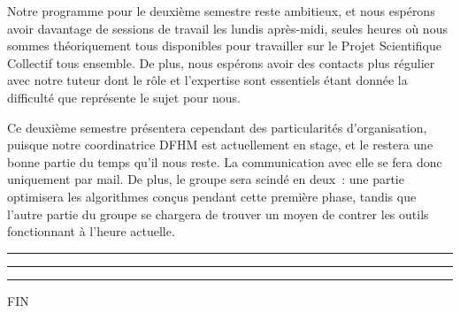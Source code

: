 \documentclass[a4paper, 12pt,twoside]{article}
\begin{document}
        Notre programme pour le deuxième semestre reste ambitieux, et nous espérons avoir davantage de sessions de travail les lundis après-midi, seules heures où nous sommes théoriquement tous disponibles pour travailler sur le Projet Scientifique Collectif tous ensemble. De plus, nous espérons avoir des contacts plus régulier avec notre tuteur dont le rôle et l'expertise sont essentiels étant donnée la difficulté que représente le sujet pour nous.

        Ce deuxième semestre présentera cependant des particularités d'organisation, puisque notre coordinatrice DFHM est actuellement en stage, et le restera une bonne partie du temps qu'il nous reste. La communication avec elle se fera donc uniquement par mail. De plus, le groupe sera scindé en deux~: une partie optimisera les algorithmes conçus pendant cette première phase, tandis que l'autre partie du groupe se chargera de trouver un moyen de contrer les outils fonctionnant à l'heure actuelle.

    \begin{center}
        \color{bleu303}

        \rule{0.3\textwidth}{0.2mm}\vspace*{-3.5mm}

        \rule{0.5\textwidth}{0.6mm}\vspace*{-3.8mm}

        \rule{0.3\textwidth}{0.2mm}\vspace*{-1mm}

        \sffamily FIN
    \end{center}
\end{document}

